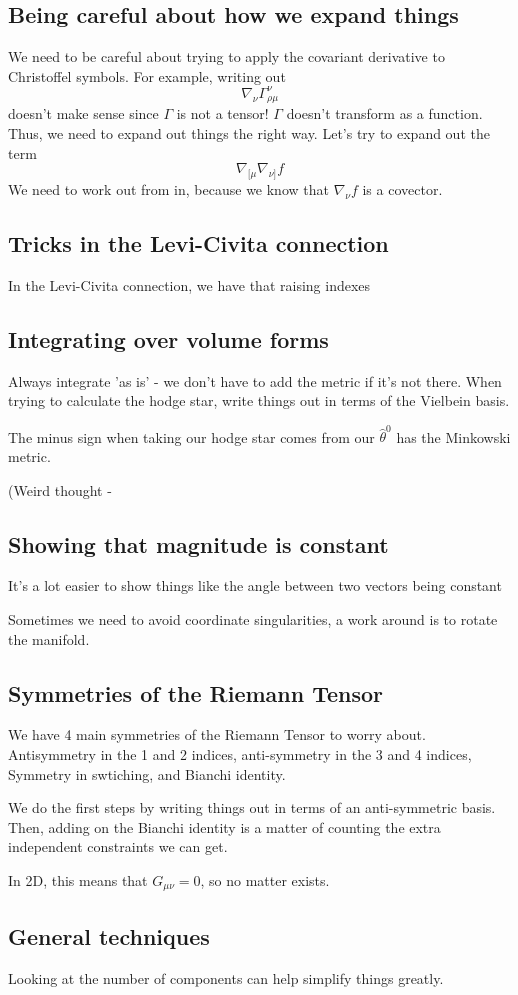 \subsection{Being careful about how we expand things} 
We need to be careful about trying to 
apply the covariant derivative to Christoffel symbols. 
For example, writing out 
\[
 \nabla _ \nu \Gamma ^ \nu _{ \rho \mu } 
\]  doesn't make sense since $ \Gamma $ is not a tensor!
$ \Gamma $ doesn't transform as a function. 
Thus, we need to expand out things the right way. 
Let's try to expand out the 
term 
\[
	\nabla _{ [ \mu } \nabla _{ \nu ] } f 
\] We need to work out from in, because 
we know that $ \nabla _{ \nu } f $ is a covector. 

\subsection{Tricks in the Levi-Civita connection} 
In the Levi-Civita connection, we have that 
raising indexes 

\subsection{Integrating over volume forms} 
Always integrate 'as is'  - we don't have to add
the metric if it's not there. 
When trying to calculate the hodge star, 
write things out in terms of the Vielbein basis. 

The minus sign when taking our hodge star comes
from our $ \hat{\theta } ^ 0 $ has the Minkowski metric. 

(Weird thought - 

\subsection{Showing that magnitude is constant} 
It's a lot easier to 
show things like the angle between two 
vectors being constant 

Sometimes we need to avoid coordinate singularities, 
a work around is to rotate the manifold. 

\subsection{Symmetries of the Riemann Tensor} 
We have 4 main symmetries of the Riemann Tensor to worry about. 
Antisymmetry in the 1 and 2 indices, anti-symmetry in the 3 and 4 indices, 
Symmetry in swtiching, and Bianchi identity.

We do the first steps by writing things out in
terms of an anti-symmetric basis. Then, adding 
on the Bianchi identity is a matter of counting the extra independent 
constraints we can get.

In 2D, this means that $G_{ \mu \nu} =0 $, so no
matter exists. 

\subsection{General techniques} 
Looking at the number of components 
can help simplify things greatly. 
